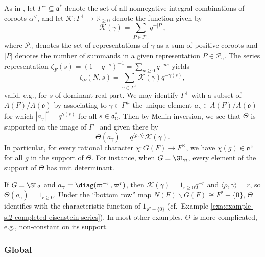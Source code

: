As in \cite[\S3.12]{MR1694894}, let $\Gamma^+ \subseteq \mathfrak{a}^*$ denote the set of all nonnegative integral combinations of coroots $\alpha^\vee$, and let $\mathcal{K} : \Gamma^+ \rightarrow \mathbb{R}_{\geq 0}$ denote the function given by
\begin{equation*}
  \mathcal{K}(\gamma) = \sum_{P \in \mathcal{P}_\gamma } q^{-|P|},
\end{equation*}
where $\mathcal{P}_\gamma$ denotes the set of representations of $\gamma$ as a sum of positive coroots and $|P|$ denotes the number of summands in a given representation $P \in \mathcal{P}_\gamma$.  The series representation $\zeta_F(s) = (1 - q^{-s})^{-1} = \sum_{n \geq 0} q^{-n s}$  yields
\begin{equation*}
  \zeta_F(N,s)
  =
  \sum_{\gamma \in \Gamma^+ }
  \mathcal{K}(\gamma)
  q^{- \gamma(s) },
\end{equation*}
valid, e.g., for $s$ of dominant real part.  We may identify $\Gamma^+$ with a subset of $A(F) / A(\mathfrak{o})$ by associating to $\gamma \in \Gamma^+$ the unique element $a_\gamma \in A(F) / A(\mathfrak{o})$ for which $|a_\gamma|^s = q^{\gamma(s)}$ for all $s \in \mathfrak{a}_{\mathbb{C}}^*$.  Then by Mellin inversion, we see that $\Theta$ is supported on the image of $\Gamma^+$ and given there by
\begin{equation*}
  \Theta(a_\gamma) = q^{ \langle \rho, \gamma  \rangle} \mathcal{K}(\gamma).
\end{equation*}
In particular, for every rational character $\chi : G(F) \rightarrow F^\times$, we have $\chi(g) \in \mathfrak{o}^\times$ for all $g$ in the support of $\Theta$.  For instance, when $G = \GL_n$, every element of the support of $\Theta$ has unit determinant.

\begin{example}
  If $G = \SL_2$ and $a_\gamma = \diag(\varpi^{-r}, \varpi^r)$, then $\mathcal{K}(\gamma) = 1_{r \geq 0} q^{-r}$ and $\langle \rho, \gamma  \rangle = r$, so $\Theta(a_\gamma) = 1_{r \geq 0}$.  Under the ``bottom row'' map $N(F) \backslash G(F) \cong F^2 - \{0\}$, $\Theta$ identifies with the characteristic function of $1_{\mathfrak{o}^2 - \{0\}}$ (cf.\ Example \ref{exa:example-sl2-completed-eisenstein-series}).  In most other examples, $\Theta$ is more complicated, e.g., non-constant on its support.
\end{example}



\subsubsection{Global}

